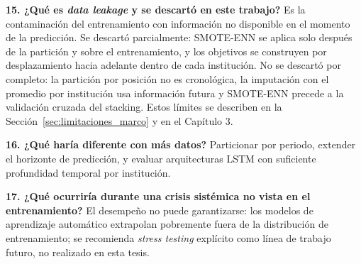 \textbf{15. ¿Qué es \textit{data leakage} y se descartó en este trabajo?} Es la contaminación del entrenamiento con información no disponible en el momento de la predicción. Se descartó parcialmente: SMOTE-ENN se aplica solo después de la partición y sobre el entrenamiento, y los objetivos se construyen por desplazamiento hacia adelante dentro de cada institución. No se descartó por completo: la partición por posición no es cronológica, la imputación con el promedio por institución usa información futura y SMOTE-ENN precede a la validación cruzada del stacking. Estos límites se describen en la Sección~\ref{sec:limitaciones_marco} y en el Capítulo 3.

\textbf{16. ¿Qué haría diferente con más datos?} Particionar por periodo, extender el horizonte de predicción, y evaluar arquitecturas LSTM con suficiente profundidad temporal por institución.

\textbf{17. ¿Qué ocurriría durante una crisis sistémica no vista en el entrenamiento?} El desempeño no puede garantizarse: los modelos de aprendizaje automático extrapolan pobremente fuera de la distribución de entrenamiento; se recomienda \textit{stress testing} explícito como línea de trabajo futuro, no realizado en esta tesis.

